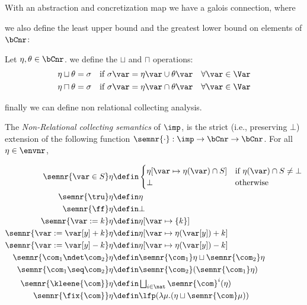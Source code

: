 With an abstraction and concretization map we have a galois
connection, where 

we also define the least upper bound and the greatest lower bound on
elements of \(\bCnr\):

\begin{definition}
  Let \(\eta,\theta \in \bCnr\). we define the \(\sqcup\) and
  \(\sqcap\) operations:
  \begin{align*}
    \eta \sqcup \theta & = \sigma & \text{if } \sigma\var = \eta\var \cup \theta\var \quad \forall \var \in \Var \\
    \eta \sqcap \theta & = \sigma & \text{if } \sigma\var = \eta\var \cap \theta\var \quad \forall \var \in \Var \\
  \end{align*}
\end{definition}

finally we can define non relational collecting analysis.

\begin{definition}\label{def:nonrel}
  The \emph{Non-Relational collecting semantics} of \(\imp\), is the
  strict (i.e., preserving \(\bot\))
  extension of the following function \(\semnr{\cdot}: \imp \to
  \bCnr \to \bCnr\). For all \(\eta \in \envnr\),

  \begin{align*}
    \semnr{\var \in S}\eta 
    & \defin  
      \begin{cases}
        \eta[\var \mapsto \eta(\var)\cap S] & \text{if }\eta(\var)\cap S\neq \bot \\ \bot & \text{otherwise}
      \end{cases}\\
    \semnr{\tru}\eta 
    & \defin \eta\\
    \semnr{\ff}\eta 
    & \defin \bot\\
    \semnr{\var := k}\eta 
    & \defin \eta[\var \mapsto \{k\}]\\
    \semnr{\var := \var[y] + k}\eta 
    & \defin \eta[\var \mapsto \eta (\var[y]) + k]\\
    \semnr{\var := \var[y] - k}\eta 
    & \defin \eta[\var \mapsto \eta (\var[y]) - k]\\
    \semnr{\com_1 \ndet \com_2} \eta
    & \defin \semnr{\com_1} \eta \sqcup \semnr{\com_2} \eta\\
    \semnr{\com_1 \seq \com_2} \eta
    & \defin \semnr{\com_2} (\semnr{\com_1} \eta)\\
    \semnr{\kleene{\com}} \eta
    & \defin \textstyle \bigsqcup_{i \in \nat} \semnr{\com}^i (\eta)\\
    \semnr{\fix{\com}} \eta
    & \defin  \lfp(\lambda \mu. (\eta \sqcup \semnr{\com} \mu))
  \end{align*}
\end{definition}